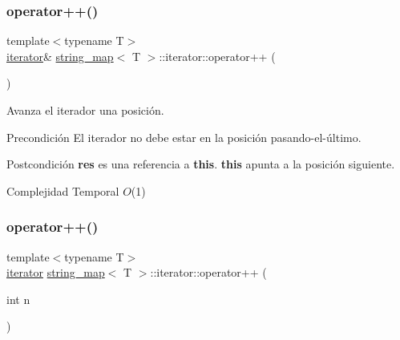 \subsubsection{\texorpdfstring{operator++()}{operator++()}\hspace{0.1cm}{\footnotesize\ttfamily [1/2]}}
{\footnotesize\ttfamily template$<$typename T$>$ \\
\mbox{\hyperlink{classstring__map_1_1iterator}{iterator}}\& \mbox{\hyperlink{classstring__map}{string\+\_\+map}}$<$ T $>$\+::iterator\+::operator++ (\begin{DoxyParamCaption}{ }\end{DoxyParamCaption})\hspace{0.3cm}{\ttfamily [inline]}}



Avanza el iterador una posición. 

\begin{DoxyPrecond}{Precondición}
El iterador no debe estar en la posición pasando-\/el-\/último. 
\end{DoxyPrecond}
\begin{DoxyPostcond}{Postcondición}
{\bfseries res} es una referencia a {\bfseries this}. {\bfseries this} apunta a la posición siguiente.
\end{DoxyPostcond}

\begin{DoxyDescription}
\item[Complejidad Temporal]$O$(1)
\end{DoxyDescription}\mbox{\label{classstring__map_1_1iterator_a8b5800a8088641deb59733b264741456}} 
\subsubsection{\texorpdfstring{operator++()}{operator++()}\hspace{0.1cm}{\footnotesize\ttfamily [2/2]}}
{\footnotesize\ttfamily template$<$typename T$>$ \\
\mbox{\hyperlink{classstring__map_1_1iterator}{iterator}} \mbox{\hyperlink{classstring__map}{string\+\_\+map}}$<$ T $>$\+::iterator\+::operator++ (\begin{DoxyParamCaption}\item[{int}]{n }\end{DoxyParamCaption})\hspace{0.3cm}{\ttfamily [inline]}}



